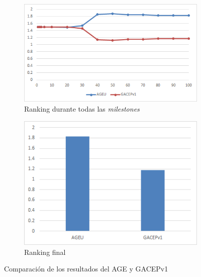 \begin{figure}
     \centering
     \begin{subfigure}[b]{0.45\textwidth}
         \centering
         \includegraphics[width=\textwidth]{imagenes/Experimental/AGEUvsGACEPv1.png}
         \caption{Ranking durante todas las \textit{milestones}}
         \label{fig:AGEUvsGACEPv1_lineas}
     \end{subfigure}
     \hfill
     \begin{subfigure}[b]{0.45\textwidth}
         \centering
         \includegraphics[width=\textwidth]{imagenes/Experimental/barras/AGEUvsGACEPv1.png}
         \caption{Ranking final}
         \label{fig:AGEUvsGACEPv1_barras}
     \end{subfigure}
        \caption{Comparación de los resultados del AGE y GACEPv1}
        \label{fig:AGEUvsGACEPv1}
\end{figure}


